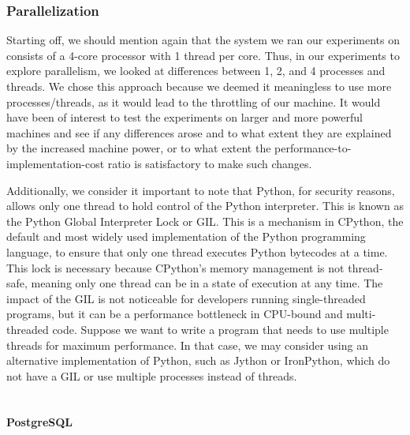 \subsubsection{Parallelization}

Starting off, we should mention again that the system we ran our experiments on consists of a 4-core processor with 1 thread per core. 
Thus, in our experiments to explore parallelism, we looked at differences between 1, 2, and 4 processes and threads. 
We chose this approach because we deemed it meaningless to use more processes/threads, as it would lead to the throttling of our machine. 
It would have been of interest to test the experiments on larger and more powerful machines and see if any differences arose 
and to what extent they are explained by the increased machine power, or to what extent the performance-to-implementation-cost ratio is satisfactory 
to make such changes.

Additionally, we consider it important to note that Python, for security reasons, allows only one thread to hold control of the Python interpreter. 
This is known as the Python Global Interpreter Lock or GIL. This is a mechanism in CPython, the default and most widely used implementation of the 
Python programming language, to ensure that only one thread executes Python bytecodes at a time. 
This lock is necessary because CPython's memory management is not thread-safe, meaning only one thread can be in a state of execution at any time. 
The impact of the GIL is not noticeable for developers running single-threaded programs, 
but it can be a performance bottleneck in CPU-bound and multi-threaded code. Suppose we want to write a program that needs to use multiple threads 
for maximum performance. In that case, we may consider using an alternative implementation of Python, such as Jython or IronPython, 
which do not have a GIL or use multiple processes instead of threads.\\\\

\paragraph{PostgreSQL}

